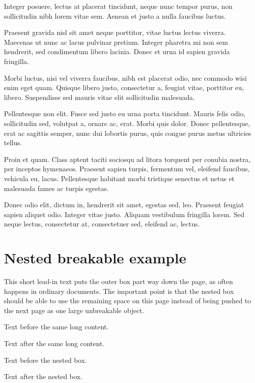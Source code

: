 {Integer posuere, lectus at placerat tincidunt, neque nunc tempor purus, non
sollicitudin nibh lorem vitae sem. Aenean et justo a nulla faucibus luctus.

Praesent gravida nisl sit amet neque porttitor, vitae luctus lectus viverra.
Maecenas ut nunc ac lacus pulvinar pretium. Integer pharetra mi non sem
hendrerit, sed condimentum libero lacinia. Donec et urna id sapien gravida
fringilla.

Morbi luctus, nisi vel viverra faucibus, nibh est placerat odio, nec commodo
wisi enim eget quam. Quisque libero justo, consectetur a, feugiat vitae,
porttitor eu, libero. Suspendisse sed mauris vitae elit sollicitudin malesuada.

Pellentesque non elit. Fusce sed justo eu urna porta tincidunt. Mauris felis
odio, sollicitudin sed, volutpat a, ornare ac, erat. Morbi quis dolor. Donec
pellentesque, erat ac sagittis semper, nunc dui lobortis purus, quis congue
purus metus ultricies tellus.

Proin et quam. Class aptent taciti sociosqu ad litora torquent per conubia
nostra, per inceptos hymenaeos. Praesent sapien turpis, fermentum vel, eleifend
faucibus, vehicula eu, lacus. Pellentesque habitant morbi tristique senectus et
netus et malesuada fames ac turpis egestas.

Donec odio elit, dictum in, hendrerit sit amet, egestas sed, leo. Praesent
feugiat sapien aliquet odio. Integer vitae justo. Aliquam vestibulum fringilla
lorem. Sed neque lectus, consectetur at, consectetuer sed, eleifend ac, lectus.
}



\section*{Nested breakable example}

This short lead-in text puts the outer box part way down the page, as often
happens in ordinary documents. The important point is that the nested box should
be able to use the remaining space on this page instead of being pushed to the
next page as one large unbreakable object.

\ifdefined\ReadmeDemoReference
\begin{outerdemo}
Text before the same long content.

\ReadmeDemoInnerContent

Text after the same long content.
\end{outerdemo}
\else
\begin{outerdemo}
Text before the nested box.

\begin{innerdemo}
\ReadmeDemoInnerContent
\end{innerdemo}

Text after the nested box.
\end{outerdemo}
\fi


